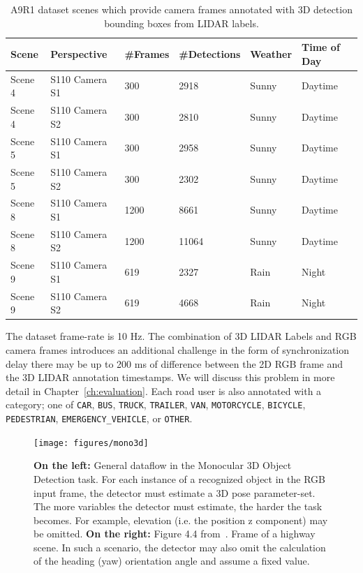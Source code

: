 \begin{table}[h]
    \centering
    \caption{A9R1 dataset scenes which provide camera frames annotated with 3D detection bounding boxes from LIDAR labels.}
    \label{tab:a9r1}
    \begin{tabular}{llllll}
        \toprule
        Scene & Perspective & \#Frames & \#Detections & Weather & Time of Day \\
        \midrule
        Scene 4 & S110 Camera S1 & 300 & 2918 & Sunny & Daytime \\
        Scene 4 & S110 Camera S2 & 300 & 2810 & Sunny & Daytime \\
        \midrule
        Scene 5 & S110 Camera S1 & 300 & 2958 & Sunny & Daytime \\
        Scene 5 & S110 Camera S2 & 300 & 2302 & Sunny & Daytime \\
        \midrule
        Scene 8 & S110 Camera S1 & 1200 & 8661 & Sunny & Daytime \\
        Scene 8 & S110 Camera S2 & 1200 & 11064 & Sunny & Daytime \\
        \midrule
        Scene 9 & S110 Camera S1 & 619 & 2327 & Rain & Night \\
        Scene 9 & S110 Camera S2 & 619 & 4668 & Rain & Night \\
        \bottomrule
    \end{tabular}
\end{table}

The dataset frame-rate is 10 Hz. The combination of 3D LIDAR Labels and RGB camera frames introduces an additional challenge in the form of synchronization delay \textemdash there may be up to 200 ms of difference between the 2D RGB frame and the 3D LIDAR annotation timestamps.
We will discuss this problem in more detail in Chapter~\ref{ch:evaluation}.
Each road user is also annotated with a category; one of \texttt{CAR}, \texttt{BUS}, \texttt{TRUCK}, \texttt{TRAILER}, \texttt{VAN}, \texttt{MOTORCYCLE}, \texttt{BICYCLE}, \texttt{PEDESTRIAN}, \texttt{EMERGENCY\_VEHICLE}, or \texttt{OTHER}.


\begin{figure}[htb]
    \texttt{[image: figures/mono3d]}
    \caption{\textbf{On the left:} General dataflow in the Monocular 3D Object Detection task. For each instance of a recognized object in the RGB input frame, the detector must estimate a 3D pose parameter-set. The more variables the detector must estimate, the harder the task becomes. For example, elevation (i.e. the position z component) may be omitted. \textbf{On the right:} Figure 4.4 from~\cite{leonthesis}. Frame of a highway scene. In such a scenario, the detector may also omit the calculation of the heading (yaw) orientation angle and assume a fixed value.}
    \label{fig:mono3d-task-overview}
\end{figure}

